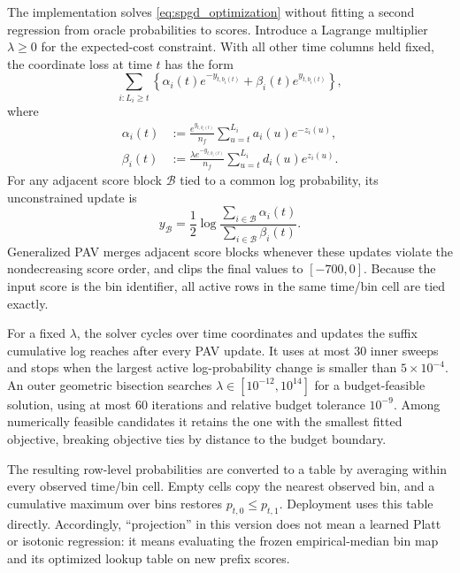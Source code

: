 The implementation solves \eqref{eq:spgd_optimization} without fitting a
second regression from oracle probabilities to scores.  Introduce a
Lagrange multiplier $\lambda\geq0$ for the expected-cost constraint.  With all
other time columns held fixed, the coordinate loss at time $t$ has the form
\begin{equation}
    \sum_{i:L_i\geq t}
       \left\{\alpha_i(t)e^{-y_{t,b_i(t)}}
             +\beta_i(t)e^{y_{t,b_i(t)}}\right\},
    \label{eq:spgd_coordinate_loss}
\end{equation}
where
\begin{align}
    \alpha_i(t)
    &:=\frac{e^{y_{t,b_i(t)}}}{n_f}
      \sum_{u=t}^{L_i}a_i(u)e^{-z_i(u)},\\
    \beta_i(t)
    &:=\frac{\lambda e^{-y_{t,b_i(t)}}}{n_f}
      \sum_{u=t}^{L_i}d_i(u)e^{z_i(u)}.
\end{align}
For any adjacent score block $\mathcal B$ tied to a common log probability,
its unconstrained update is
\begin{equation}
    y_{\mathcal B}
    =\frac12\log
      \frac{\sum_{i\in\mathcal B}\alpha_i(t)}
           {\sum_{i\in\mathcal B}\beta_i(t)}.
    \label{eq:spgd_block_update}
\end{equation}
Generalized PAV merges adjacent score blocks whenever these updates violate
the nondecreasing score order, and clips the final values to
$[-700,0]$.  Because the input score is the bin identifier, all active rows
in the same time/bin cell are tied exactly.

For a fixed $\lambda$, the solver cycles over time coordinates and updates
the suffix cumulative log reaches after every PAV update.  It uses at most
$30$ inner sweeps and stops when the largest active log-probability change is
smaller than $5\times10^{-4}$.  An outer geometric bisection searches
$\lambda\in[10^{-12},10^{14}]$ for a budget-feasible solution, using at most
$60$ iterations and relative budget tolerance $10^{-9}$.  Among numerically
feasible candidates it retains the one with the smallest fitted objective,
breaking objective ties by distance to the budget boundary.

The resulting row-level probabilities are converted to a table by averaging
within every observed time/bin cell.  Empty cells copy the nearest observed
bin, and a cumulative maximum over bins restores
$p_{t,0}\leq p_{t,1}$.  Deployment uses this table directly.  Accordingly,
``projection'' in this version does not mean a learned Platt or isotonic
regression: it means evaluating the frozen empirical-median bin map and its
optimized lookup table on new prefix scores.

